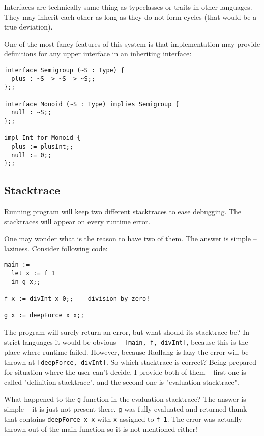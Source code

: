 \documentclass[11pt]{article}
\begin{document}
Interfaces are technically same thing as typeclasses or traits in other languages. They may inherit each other as long as they do not form cycles (that would be a true deviation).

One of the most fancy features of this system is that implementation may provide definitions for any upper interface in an inheriting interface:

\begin{verbatim}
interface Semigroup (~S : Type) {
  plus : ~S -> ~S -> ~S;;
};;

interface Monoid (~S : Type) implies Semigroup {
  null : ~S;;
};;

impl Int for Monoid {
  plus := plusInt;;
  null := 0;;
};;
\end{verbatim}

\subsection{Stacktrace}
\label{sec:orga010fc7}

Running program will keep two different stacktraces to ease debugging. The stacktraces will appear on every runtime error.

One may wonder what is the reason to have two of them. The answer is simple – laziness. Consider following code:

\begin{verbatim}
main :=
  let x := f 1
  in g x;;

f x := divInt x 0;; -- division by zero!

g x := deepForce x x;;
\end{verbatim}

The program will surely return an error, but what should its stacktrace be? In strict languages it would be obvious – \texttt{[main, f, divInt]}, because this is the place where runtime failed. However, because Radlang is lazy the error will be thrown at \texttt{[deepForce, divInt]}. So which stacktrace is correct? Being prepared for situation where the user can't decide, I provide both of them – first one is called "definition stacktrace", and the second one is "evaluation stacktrace".

What happened to the \texttt{g} function in the evaluation stacktrace? The answer is simple – it is just not present there. \texttt{g} was fully evaluated and returned thunk that contains \texttt{deepForce x x} with \texttt{x} assigned to \texttt{f 1}. The error was actually thrown out of the main function so it is not mentioned either!
\end{document}
